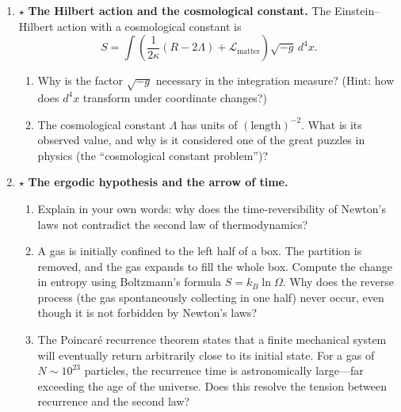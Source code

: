 \begin{enumerate}
    \item $\star$ \textbf{The Hilbert action and the cosmological constant.} The Einstein--Hilbert action with a cosmological constant is
    \[
    S = \int \left( \frac{1}{2\kappa}(R - 2\Lambda) + \mathcal{L}_{\text{matter}} \right) \sqrt{-g} \, d^4x.
    \]
    \begin{enumerate}
        \item Why is the factor $\sqrt{-g}$ necessary in the integration measure? (Hint: how does $d^4x$ transform under coordinate changes?)
        \item The cosmological constant $\Lambda$ has units of $(\text{length})^{-2}$. What is its observed value, and why is it considered one of the great puzzles in physics (the ``cosmological constant problem'')?
    \end{enumerate}

    \item $\star$ \textbf{The ergodic hypothesis and the arrow of time.}
    \begin{enumerate}
        \item Explain in your own words: why does the time-reversibility of Newton's laws not contradict the second law of thermodynamics?
        \item A gas is initially confined to the left half of a box. The partition is removed, and the gas expands to fill the whole box. Compute the change in entropy using Boltzmann's formula $S = k_B \ln \Omega$. Why does the reverse process (the gas spontaneously collecting in one half) never occur, even though it is not forbidden by Newton's laws?
        \item The Poincar\'e recurrence theorem states that a finite mechanical system will eventually return arbitrarily close to its initial state. For a gas of $N \sim 10^{23}$ particles, the recurrence time is astronomically large---far exceeding the age of the universe. Does this resolve the tension between recurrence and the second law?
    \end{enumerate}

\end{enumerate}
